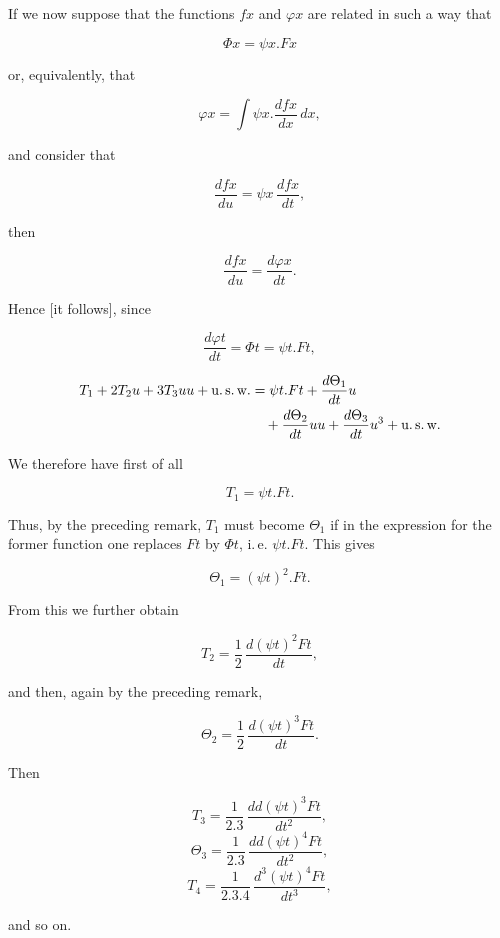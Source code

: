 %

If we now suppose that the functions $fx$ and $\varphi x$ are related in such a way that

\[ \Phi x = \psi x \mathord{.} Fx \]

\noindent or, equivalently, that

\[ \varphi x = \int \psi x \mathord{.} \frac{dfx}{dx}\,dx, \]

\noindent and consider that

\[ \frac{dfx}{du} = \psi x\,\frac{dfx}{dt}, \]

\noindent then

\[ \frac{dfx}{du} = \frac{d\varphi x}{dt}. \]

\noindent Hence [it follows], since

\[ \frac{d\varphi t}{dt} = \Phi t = \psi t \mathord{.} Ft, \]

\[\begin{aligned}
T_1 + 2 T_2 u + 3 T_3 uu + \text{u.\,s.\,w.}
&= \psi t\mathord{.}Ft+\frac{d\Theta_1}{dt}u\\
&\quad+\frac{d\Theta_2}{dt}uu+\frac{d\Theta_3}{dt}u^3+\text{u.\,s.\,w.}
\end{aligned}\]

\noindent We therefore have first of all

\[ T_1 = \psi t \mathord{.} Ft. \]

\noindent Thus, by the preceding remark, $T_1$ must become $\Theta_1$ if in the expression for the former function one replaces $Ft$ by $\Phi t$, i.\,e. $\psi t \mathord{.} Ft$. This gives

\[ \Theta_1 = (\psi t)^2 \mathord{.} Ft. \]

\noindent From this we further obtain

\[ T_2 = \frac{1}{2}\,\frac{d(\psi t)^2 Ft}{dt}, \]

\noindent and then, again by the preceding remark,

\[ \Theta_2 = \frac{1}{2}\,\frac{d(\psi t)^3 Ft}{dt}. \]

\noindent Then

\[ T_3 = \frac{1}{2.3}\,\frac{dd(\psi t)^3 Ft}{dt^2}, \]
\[ \Theta_3 = \frac{1}{2.3}\,\frac{dd(\psi t)^4 Ft}{dt^2}, \]
\[ T_4 = \frac{1}{2.3.4}\,\frac{d^3(\psi t)^4 Ft}{dt^3}, \]

\begin{center}and so on.\end{center}
